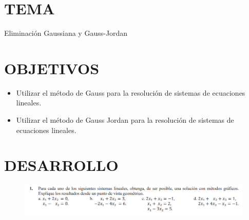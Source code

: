\documentclass[12pt]{article}
\begin{document}
\section*{TEMA}
Eliminación Gaussiana y Gauss-Jordan

\vspace{0.5cm}

\section*{OBJETIVOS}
\begin{itemize}
    \item Utilizar el método de Gauss para la  resolución de sistemas de ecuaciones lineales.
    \item Utilizar el método de Gauss Jordan para la resolución de sistemas de ecuaciones lineales.

\end{itemize}

\vspace{0.5cm}


\section*{DESARROLLO}

\begin{figure}[H]
\includegraphics[width=1\textwidth]{./inFiles/Figures/Ej1.png}
\end{figure}
\end{document}
